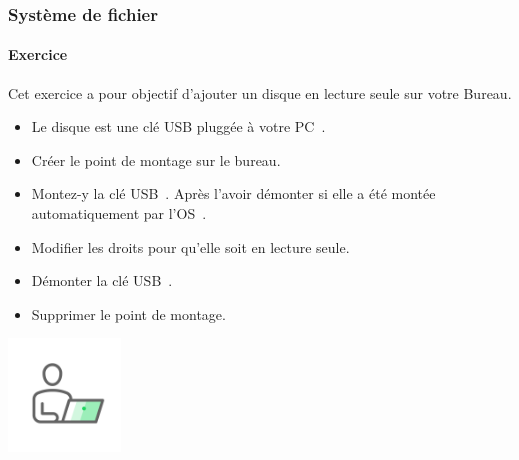 \documentclass{beamer}
\begin{document}
    \begin{frame}
        \transdissolve
        \frametitle{Système de fichier}
        \framesubtitle{Exercice \execcounterdispinc}
        \setcounter{exemountcounter}{\value{execounter}}
        \addtocounter{exemountcounter}{1}
        Cet exercice a pour objectif d'ajouter un disque en lecture seule sur votre Bureau.
        \begin{itemize}
            \item Le disque est une clé USB pluggée à votre PC~.
            \item Créer le point de montage sur le bureau.
            \item Montez-y la clé USB~.
            Après l'avoir démonter si elle a été montée automatiquement par l'OS~.
            \item Modifier les droits pour qu'elle soit en lecture seule.
            \item Démonter la clé USB~.
            \item Supprimer le point de montage.
        \end{itemize}
        \bigbreak
        \centering
        \includegraphics[width=3cm]{image/guy-in-front-of-desktop}
    \end{frame}
\end{document}
